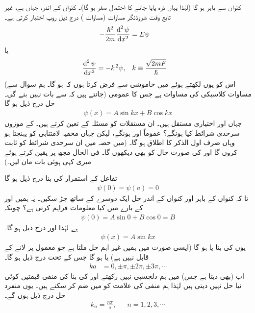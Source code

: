 کنواں سے باہر  ہو گا  (لہٰذا یہاں ذرہ پایا جانے  کا احتمال صفر ہو گا)۔ کنواں کے اندر، جہاں  ہے،  غیر تابع وقت  شروڈنگر مساوات  (مساوات ) درج ذیل روپ اختیار کرتی ہے۔
\begin{align}
-\frac{\hslash^{2}}{2m}\frac{\dif^{\,2}\psi}{\dif x^{2}}&=E\psi
\end{align} 
یا 
\begin{align}\label{مساوات_شروڈنگر_کلاسیکی_ہارمونی_مرتعش}
\frac{\dif^{\,2}\psi}{\dif x^{2}}&=-k^{\,2}\psi, && k\equiv \frac{\sqrt{2mF}}{\hslash}
\end{align}
(اس کو یوں لکھتے ہوئے  میں  خاموشی سے فرض کرتا ہوں کہ  ہو گا۔ ہم  سوال  سے جانتے ہیں کہ  سے بات نہیں بنے گی۔)   مساوات   کلاسیکی  کی مساوات ہے جس کا عمومی حل درج ذیل  ہو گا
\begin{align}
\psi(x)=A\sin kx+B\cos kx
\end{align}
 جہاں   اور   اختیاری مستقل ہیں۔ ان مستقلات کو مسئلہ  کے  تعین کرتے ہیں۔  کے موزوں سرحدی شرائط کیا ہونگے؟ عموماً  اور   ہونگے، لیکن جہاں مخفیہ لامتناہی کو پہنچتا ہو وہاں  صرف اول الذکر کا اطلاق ہو گا۔ (میں حصہ  میں ان سرحدی شرائط کو ثابت کروں گا اور    کی صورت حال کو بھی دیکھوں گا۔ فی الحال مجھ پر یقین کرتے ہوئے میری کہی ہوئی بات مان لیں۔) 

تفاعل  کے استمرار کی بنا درج ذیل ہو گا
\begin{align}
\psi(0)=\psi(a)=0
\end{align} 
تا کہ کنواں کے باہر اور کنواں کے اندر حل ایک دوسرے کے ساتھ جڑ سکیں۔ یہ ہمیں  اور  کے بارے میں کیا معلومات فراہم کرتی ہے؟ چونکہ
\begin{align*}
\psi(0)=A\sin 0+B\cos 0=B
\end{align*}
ہے لہٰذا   اور درج ذیل ہو گا۔
\begin{align}
\psi(x)=A\sin kx
\end{align}
یوں   کی بنا یا    ہو گا (ایسی صورت میں ہمیں غیر اہم حل   ملتا ہے جو معمول پر لانے کے قابل نہیں ہے)  یا   ہو گا جس کے تحت درج ذیل ہو گا۔
\begin{align}
ka&=0,\pm\pi,\pm2\pi,\pm3\pi,\cdots
\end{align} 
اب   (بھی   دیتا ہے جس) میں ہم دلچسپی نہیں رکھتے اور    کی بنا  کی منفی قیمتیں کوئی نیا حل نہیں دیتی ہیں  لہٰذا ہم منفی کی علامت کو   میں ضم کر سکتے ہیں۔ یوں منفرد حل درج ذیل ہوں گے۔ 
\begin{align}
k_{n}=\frac{n\pi}{a},&& n=1,2,3,\cdots
\end{align}

